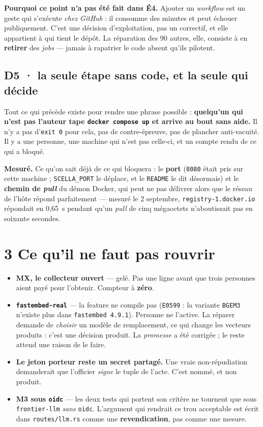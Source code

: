 \documentclass[11pt]{article}
\newcommand{\code}[1]{\texttt{\small #1}}
\newcommand{\pire}[1]{{\color{efered}\textbf{#1}}}
\newcommand{\mm}[1]{\textbf{#1}}
\newcommand{\mesure}[1]{{\color{efeteal}\textbf{Mesuré.} }#1\par}
\begin{document}
\begin{cadre}
\textbf{Pourquoi ce point n'a pas été fait dans \mm{É4}.} Ajouter un \emph{workflow} est un geste
qui s'exécute \emph{chez GitHub} : il consomme des minutes et peut échouer publiquement. C'est une
décision d'exploitation, pas un correctif, et elle appartient à qui tient le dépôt. La réparation
des 90 autres, elle, consiste à en \textbf{retirer} des \emph{jobs} --- jamais à rapatrier le code
absent qu'ils pilotent.
\end{cadre}

\subsection{\mm{D5} · la seule étape sans code, et la seule qui décide}
Tout ce qui précède existe pour rendre une phrase possible : \textbf{quelqu'un qui n'est pas
l'auteur tape \code{docker compose up} et arrive au bout sans aide.} Il n'y a pas d'\code{exit 0}
pour cela, pas de contre-épreuve, pas de plancher anti-vacuité. Il y a une personne, une machine
qui n'est pas celle-ci, et un compte rendu de ce qui a bloqué.

\mesure{Ce qu'on sait déjà de ce qui bloquera : le \textbf{port} (\code{8080} était pris sur cette
machine ; \code{SCELLA\_PORT} le déplace, et le \code{README} le dit désormais) et le
\textbf{chemin de \emph{pull}} du démon Docker, qui peut ne pas délivrer alors que le réseau de
l'hôte répond parfaitement --- mesuré le 2 septembre, \code{registry-1.docker.io} répondait en
0,65~s pendant qu'un \emph{pull} de cinq mégaoctets n'aboutissait pas en soixante secondes.}

\section{3 \;\textbar\; Ce qu'il ne faut pas rouvrir}

\begin{itemize}[leftmargin=1.1em,itemsep=1.5pt,topsep=2pt]
\item \textbf{\mm{MX}, le collecteur ouvert} --- gelé. Pas une ligne avant que trois personnes
aient payé pour l'obtenir. Compteur à \pire{zéro}.
\item \textbf{\code{fastembed-real}} --- la feature ne compile pas (\code{E0599} : la variante
\code{BGEM3} n'existe plus dans \code{fastembed 4.9.1}). Personne ne l'active. La réparer demande
de \emph{choisir} un modèle de remplacement, ce qui change les vecteurs produits : c'est une
décision produit. La \emph{promesse} a été corrigée ; le reste attend une raison de le faire.
\item \textbf{Le jeton porteur reste un secret partagé.} Une vraie non-répudiation demanderait que
l'officier \emph{signe} le tuple de l'acte. C'est nommé, et non produit.
\item \textbf{M3 sous \code{oidc}} --- les deux tests qui portent son critère ne tournent que sous
\code{frontier-llm} \emph{sans} \code{oidc}. L'argument qui rendrait ce trou acceptable est écrit
dans \code{routes/llm.rs} comme une \textbf{revendication}, pas comme une mesure.
\end{itemize}
\end{document}
